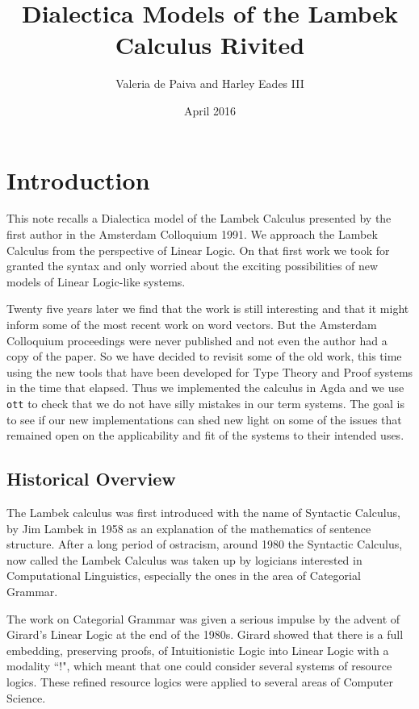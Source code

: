 \documentclass{article}
\title{Dialectica Models of the Lambek Calculus Rivited}
\author{Valeria de Paiva and Harley Eades III}
\date{April 2016}
\begin{document}
\maketitle

\section*{Introduction}
This  note recalls a Dialectica model of the Lambek Calculus presented by the first author in the Amsterdam Colloquium 1991. We approach the Lambek 
Calculus from the perspective of Linear Logic. On that first work we took for granted the syntax and only worried about the exciting possibilities of new models of Linear Logic-like systems. 

Twenty five years later we find that the work is still interesting and that it might inform some of the most recent work on word vectors. But the Amsterdam Colloquium proceedings were never published and not even the author had a copy of the paper. So we have decided to revisit some of the old work, this time using the new tools that have been developed for Type Theory and Proof systems in the time that elapsed. Thus we implemented the calculus in Agda and we use \texttt{ott} to check that we do not have silly mistakes in our term systems. The goal is to  see if our new implementations can shed new light on some of the issues that remained open on the applicability and fit of the systems to their intended uses. 

\subsection*{Historical Overview}
The Lambek calculus was first introduced  with the name of Syntactic Calculus, by Jim Lambek in 1958  as an explanation of the mathematics of sentence structure.  After a long period of ostracism, around 1980 the Syntactic Calculus, now called the Lambek Calculus was taken up by logicians interested in Computational Linguistics, especially the ones in the area of Categorial Grammar. 

The work on Categorial Grammar was given a serious impulse by  the advent of Girard's Linear Logic at the end of the 1980s.  Girard showed that there is a full embedding, preserving proofs, of Intuitionistic Logic into Linear Logic with a modality ``!", which meant that one could consider several systems of resource logics. These refined resource logics were applied to several areas of Computer Science. 
\end{document}
